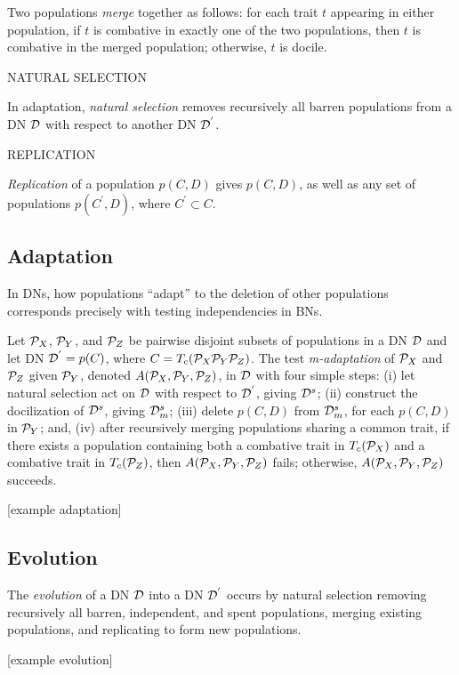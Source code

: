 		Two populations \emph{merge} together as follows: for each trait $t$ appearing in either population, if $t$ is combative in exactly one of the two populations, then $t$ is combative in the merged population; otherwise, $t$ is docile.

		NATURAL SELECTION
		
		In adaptation, \emph{natural selection} removes recursively all barren populations from a DN $\cal{D}$ with respect to another DN ${\cal{D}}^{'}$.

		REPLICATION
		
		\emph{Replication} of a population $p(C,D)$ gives $p(C,D)$, as well as any set of populations $p(C^{'}, D)$, where $C^{'} \subset C$.


\subsection{Adaptation}
\label{subsec:adaptation}


In DNs, how populations ``adapt'' to the deletion of other populations corresponds precisely with testing independencies in BNs.

Let ${\cal{P}}_X$, ${\cal{P}}_Y$, and ${\cal{P}}_Z$ be pairwise disjoint subsets of populations in a DN $\cal D$ and let DN ${\cal{D}}^{'} = {p(C)}$, where $C = T_c({\cal{P}}_X {\cal{P}}_Y {\cal{P}}_Z)$. 
The test \emph{m-adaptation} of ${\cal{P}}_X$ and ${\cal{P}}_Z$ given ${\cal{P}}_Y$, denoted $A({\cal{P}}_X,{\cal{P}}_Y,{\cal{P}}_Z)$, in $\cal D$ with four simple steps:
(i) let natural selection act on $\cal{D}$ with respect to ${\cal{D}}^{'}$, giving ${\cal{D}}^{s}$;
(ii) construct the docilization of ${\cal{D}}^{s}$, giving ${\cal{D}}^s_m$;
(iii) delete $p(C,D)$ from ${\cal{D}}^s_m$, for each $p(C,D)$ in ${\cal{P}}_Y$; and,
(iv) after recursively merging populations sharing a common trait, if there exists a population containing both a combative trait in $T_c({\cal{P}}_X)$ and a combative trait in $T_c({\cal{P}}_Z)$, then $A({\cal{P}}_X,{\cal{P}}_Y,{\cal{P}}_Z)$ fails; otherwise, $A({\cal{P}}_X,{\cal{P}}_Y,{\cal{P}}_Z)$ succeeds.


[example adaptation]


\subsection{Evolution}
\label{subsec:evolution}


%
The \emph{evolution} of a DN $\cal{D}$ into a DN ${\cal{D}}^{'}$ occurs by natural selection removing recursively all barren, independent, and spent populations, merging existing populations, and replicating to form new populations.

[example evolution]

